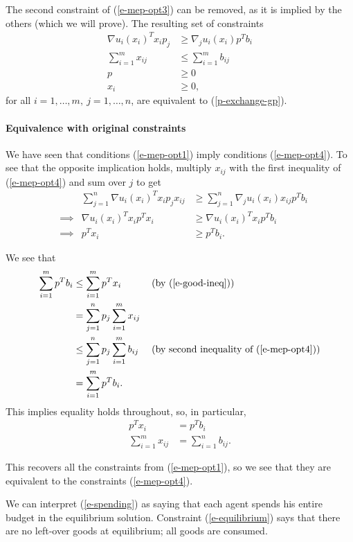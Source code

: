 \documentclass[12pt]{article}
\begin{document}
The second constraint of (\ref{e-mep-opt3}) can be removed, as it is implied by
the others (which we will prove). The resulting set of constraints
\begin{equation}
\begin{aligned}
\nabla u_i(x_i)^T x_i p_j &\geq \nabla_j u_i(x_i) p^T b_i\\
\sum_{i=1}^m x_{ij} &\leq \sum_{i=1}^m b_{ij}\\
p &\geq 0\\
x_i &\geq 0,
\end{aligned}
\label{e-mep-opt4}
\end{equation}
for all $i=1,\ldots,m,\ j=1,\ldots,n$, are equivalent to (\ref{p-exchange-gp}).

\paragraph{Equivalence with original constraints}
We have seen that conditions (\ref{e-mep-opt1}) imply conditions (\ref{e-mep-opt4}).
To see that the opposite implication holds,
multiply $x_{ij}$ with the first inequality of (\ref{e-mep-opt4}) and sum over $j$ to get
\begin{align}
&&\sum_{j=1}^n \nabla u_i(x_i)^T x_i p_j x_{ij} &\geq \sum_{j=1}^n \nabla_j u_i(x_i) x_{ij} p^T b_i \nonumber \\
&\implies & \nabla u_i(x_i)^T x_i p^T x_i &\geq \nabla u_i(x_i)^T x_i p^T b_i \nonumber\\
&\implies & p^T x_i &\geq p^T b_i. \label{e-good-ineq}
\end{align}

We see that
\begin{align*}
\sum_{i=1}^m p^T b_i &\leq \sum_{i=1}^m p^T x_i\ &&\text{(by (\ref{e-good-ineq}))}\\
&= \sum_{j=1}^n p_j \sum_{i=1}^m x_{ij} &&\\
&\leq \sum_{j=1}^n p_j \sum_{i=1}^m b_{ij}\ &&\text{(by second inequality of (\ref{e-mep-opt4}))}\\
&= \sum_{i=1}^m p^T b_i.&&
\end{align*}
This implies equality holds throughout, so, in particular,
\begin{align}
p^T x_i &= p^T b_i \label{e-spending}\\
\sum_{i=1}^m x_{ij} &= \sum_{i=1}^n b_{ij} \label{e-equilibrium}.
\end{align}

This recovers all the constraints from (\ref{e-mep-opt1}), so we see that they
are equivalent to the constraints (\ref{e-mep-opt4}).

We can interpret (\ref{e-spending}) as saying that each agent spends his entire
budget in the equilibrium solution. Constraint (\ref{e-equilibrium}) says that
there are no left-over goods at equilibrium; all goods are consumed.

\newpage


\end{document}
